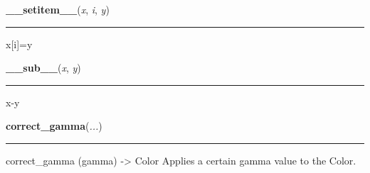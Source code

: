     \label{pygame:Color:__setitem__}

    \vspace{0.5ex}

\hspace{.8\funcindent}\begin{boxedminipage}{\funcwidth}

    \raggedright \textbf{\_\_setitem\_\_}(\textit{x}, \textit{i}, \textit{y})

    \vspace{-1.5ex}

    \rule{\textwidth}{0.5\fboxrule}
\setlength{\parskip}{2ex}
    x[i]=y

\setlength{\parskip}{1ex}
    \end{boxedminipage}

    \label{pygame:Color:__sub__}

    \vspace{0.5ex}

\hspace{.8\funcindent}\begin{boxedminipage}{\funcwidth}

    \raggedright \textbf{\_\_sub\_\_}(\textit{x}, \textit{y})

    \vspace{-1.5ex}

    \rule{\textwidth}{0.5\fboxrule}
\setlength{\parskip}{2ex}
    x-y

\setlength{\parskip}{1ex}
    \end{boxedminipage}

    \label{pygame:Color:correct_gamma}

    \vspace{0.5ex}

\hspace{.8\funcindent}\begin{boxedminipage}{\funcwidth}

    \raggedright \textbf{correct\_gamma}(\textit{...})

    \vspace{-1.5ex}

    \rule{\textwidth}{0.5\fboxrule}
\setlength{\parskip}{2ex}
    correct\_gamma (gamma) -{\textgreater} Color Applies a certain gamma 
    value to the Color.

\setlength{\parskip}{1ex}
    \end{boxedminipage}

